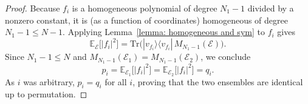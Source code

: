 \documentclass[10pt,a4paper]{amsart}
\newcommand{\Abs}[1]{\left\lvert #1\right\rvert}
\providecommand{\ketbra}[2]{|#1\rangle \langle #2|}
\newcommand{\dsE}{\mathbb{E}}
\theoremstyle{plain}
\theoremstyle{definition}
\theoremstyle{remark}
\begin{document}
\begin{proof}
Because $f_i$ is a homogeneous polynomial of degree $N_1-1$ divided by a nonzero constant,
it is (as a function of coordinates) homogeneous of degree $N_1-1\le N-1$.
Applying Lemma~\ref{lemma: homogeneous and sym} to $f_i$ gives
\[
\dsE_{\mathcal E}\!\big[\Abs{f_i}^2\big]
=
\mathrm{Tr}\!\Big(\ketbra{v_{f_i}}{v_{f_i}}\,M_{N_1-1}(\mathcal E)\Big).
\]
Since $N_1-1\le N$ and $M_{N_1-1}(\mathcal E_1)=M_{N_1-1}(\mathcal E_2)$, we conclude
\begin{equation}
p_i=\dsE_{\mathcal E_1}\!\big[\Abs{f_i}^2\big]
=\dsE_{\mathcal E_2}\!\big[\Abs{f_i}^2\big]
=q_i.
\label{eq:app-ensemble-weight-equality}
\end{equation}
As $i$ was arbitrary, $p_i=q_i$ for all $i$, proving that the two ensembles are identical up to permutation.
\end{proof}
\end{document}
